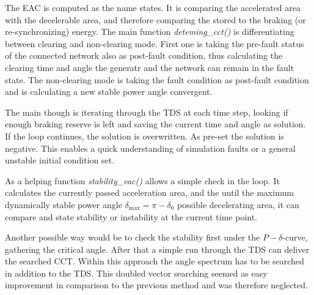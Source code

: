 
The \acf{EAC} is computed as the name states. It is comparing the accelerated area with the decelerable area, and therefore comparing the stored to the braking (or re-synchronizing) energy. The main function {\itshape deteming\_cct()} is differentiating between clearing and non-clearing mode. First one is taking the pre-fault status of the connected network also as post-fault condition, thus calculating the clearing time and angle the generatr and the network can remain in the fault state. The non-clearing mode is taking the fault condition as post-fault condition and is calculating a new stable power angle convergent.



The main though is iterating through the \acs{TDS} at each time step, looking if enough braking reserve is left and saving the current time and angle as solution. If the loop continues, the solution is overwritten. As pre-set the solution is negative. This enables a quick understanding of simulation faults or a general unstable initial condition set.

As a helping function {\itshape stability\_eac()} allows a simple check in the loop. It calculates the currently passed acceleration area, and the until the maximum dynamically stable power angle $\delta_\mathrm{max}=\pi-\delta_\mathrm{0}$ possible decelerating area, it can compare and state stability or instability at the current time point.


Another possible way would be to check the stability first under the $P-\delta$-curve, gathering the critical angle. After that a simple run through the \acs{TDS} can deliver the searched \acs{CCT}. Within this approach the angle spectrum has to be searched in addition to the \acs{TDS}. This doubled vector searching seemed as easy improvement in comparison to the previous method and was therefore neglected.

